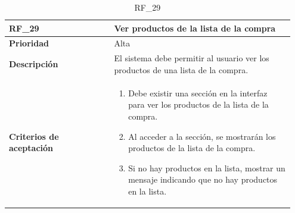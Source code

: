 \begin{table}[htb!]
    \begin{tabular}{|p{0.35\linewidth}|p{0.6\linewidth}|}
        \hline
        \rowcolor[HTML]{C0C0C0}  
        \textbf{RF\_29} & \textbf{Ver productos de la lista de la compra} \\ 
        \hline
        \textbf{Prioridad} & Alta \\ 
        \hline
        \textbf{Descripción} & El sistema debe permitir al usuario ver los productos de una lista de la compra. \\ 
        \hline
        \vspace{0.5mm}
        \textbf{Criterios de aceptación} & 
        \begin{minipage}[t]{0.9\linewidth}
            \begin{enumerate}
                \item Debe existir una sección en la interfaz para ver los productos de la lista de la compra.
                \item Al acceder a la sección, se mostrarán los productos de la lista de la compra.
                \item Si no hay productos en la lista, mostrar un mensaje indicando que no hay productos en la lista.
            \end{enumerate}
            \vspace{2mm}
        \end{minipage} \\ 
        \hline
    \end{tabular}
    \caption{RF\_29}
    \label{req:RF29}
\end{table}

